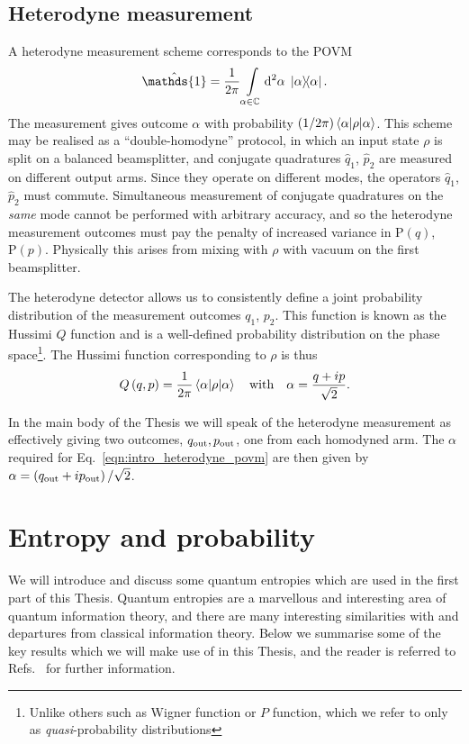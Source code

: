 \FloatBarrier
\subsection{Heterodyne measurement}\label{sec:intro_heterodyne}
A heterodyne measurement scheme corresponds to the POVM
\begin{equation}\label{eqn:intro_heterodyne_povm}
\hat{\mathds{1}} = \frac{1}{2\pi} \int\limits_{\alpha \in \mathbb{C}} \Diff2 \alpha \; \dyad{\alpha}.
\end{equation}
The measurement gives outcome $\alpha$ with probability $(1/2\pi)\ev{\rho}{\alpha}$. This scheme may be realised as a ``double-homodyne'' protocol, in which an input state $\rho$ is split on a balanced beamsplitter, and conjugate quadratures $\hat{q}_1$, $\hat{p}_2$ are measured on different output arms. Since they operate on different modes, the operators $\hat{q}_1$, $\hat{p}_2$ must commute. Simultaneous measurement of conjugate quadratures on the \emph{same} mode cannot be performed with arbitrary accuracy, and so the heterodyne measurement outcomes must pay the penalty of increased variance in $\text{P}\left(q\right)$, $\text{P}\left(p\right)$. Physically this arises from mixing with $\rho$ with vacuum on the first beamsplitter.


The heterodyne detector allows us to consistently define a joint probability distribution of the measurement outcomes $q_1$, $p_2$. This function is known as the Hussimi $Q$ function and is a well-defined probability distribution on the phase space\footnote{Unlike others such as Wigner function or $P$ function, which we refer to only as \emph{quasi}-probability distributions}. The Hussimi function corresponding to $\rho$ is thus
\begin{equation}
Q\left(q, p\right) = \frac{1}{2\pi} \ev{\rho}{\alpha} \qq{with} \alpha = \frac{q + i p}{\sqrt{2}}.
\end{equation}

\noindent In the main body of the Thesis we will speak of the heterodyne measurement as effectively giving two outcomes, $q_{\text{out}}, p_{\text{out}}$, one from each homodyned arm. The $\alpha$ required for Eq.~\ref{eqn:intro_heterodyne_povm} are then given by $\alpha = \left(q_{\text{out}} + i p_{\text{out}}\right)/\sqrt{2}$.





\FloatBarrier
\section{Entropy and probability}
We will introduce and discuss some quantum entropies which are used in the first part of this Thesis. Quantum entropies are a marvellous and interesting area of quantum information theory, and there are many interesting similarities with and departures from classical information theory. Below we summarise some of the key results which we will make use of in this Thesis, and the reader is referred to Refs.~\cite{Nielsen2010, Tomamichel2016, Wilde2013, Watrous2018} for further information.



